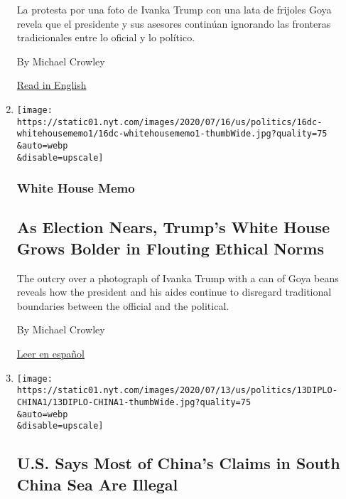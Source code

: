 \begin{enumerate}
  La protesta por una foto de Ivanka Trump con una lata de frijoles Goya
  revela que el presidente y sus asesores continúan ignorando las
  fronteras tradicionales entre lo oficial y lo político.

  By Michael Crowley

  \href{https://www.nytimes.com/2020/07/16/us/politics/trump-goya-ivanka.html}{Read
  in English}
\item
  \href{/2020/07/16/us/politics/trump-goya-ivanka.html}{}

  \texttt{[image: https://static01.nyt.com/images/2020/07/16/us/politics/16dc-whitehousememo1/16dc-whitehousememo1-thumbWide.jpg?quality=75\\\&auto=webp\\\&disable=upscale]}

  \hypertarget{white-house-memo}{%
  \subsubsection{White House Memo}\label{white-house-memo}}

  \hypertarget{as-election-nears-trumps-white-house-grows-bolder-in-flouting-ethical-norms}{%
  \subsection{As Election Nears, Trump's White House Grows Bolder in
  Flouting Ethical
  Norms}\label{as-election-nears-trumps-white-house-grows-bolder-in-flouting-ethical-norms}}

  The outcry over a photograph of Ivanka Trump with a can of Goya beans
  reveals how the president and his aides continue to disregard
  traditional boundaries between the official and the political.

  By Michael Crowley

  \href{https://www.nytimes.com/es/2020/07/16/espanol/estados-unidos/goya-trump-ivanka.html}{Leer
  en español}
\item
  \href{/2020/07/13/world/asia/south-china-sea-pompeo.html}{}

  \texttt{[image: https://static01.nyt.com/images/2020/07/13/us/politics/13DIPLO-CHINA1/13DIPLO-CHINA1-thumbWide.jpg?quality=75\\\&auto=webp\\\&disable=upscale]}

  \hypertarget{us-says-most-of-chinas-claims-in-south-china-sea-are-illegal}{%
  \subsection{U.S. Says Most of China's Claims in South China Sea Are
  Illegal}\label{us-says-most-of-chinas-claims-in-south-china-sea-are-illegal}}


\end{enumerate}
